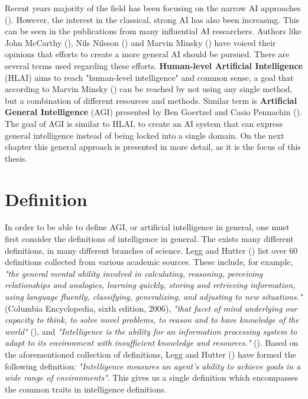 \documentclass[utf8,english]{gradu3}
\begin{document}
Recent years majority of the field has been focusing on the narrow AI approaches
(\cite{goertzel2007}). However, the interest in the classical, strong AI has
also been increasing. This can be seen in the publications from many influential
AI researchers. Authors like John McCarthy (\cite*{mccarthy2007}), Nils Nilsson
(\cite*{nilsson2005}) and Marvin Minsky (\cite*{minsky2007}) have voiced their
opinions that efforts to create a more general AI should be pursued. There are
several terms used regarding these efforts. \textbf{Human-level Artificial
Intelligence} (HLAI) aims to reach "human-level intelligence" and common sense,
a goal that according to Marvin Minsky (\cite*{minsky2004}) can be reached by
not using any single method, but a combination of different resources and
methods. Similar term is \textbf{Artificial General Intelligence} (AGI)
presented by Ben Goertzel and Casio Pennachin (\cite*{goertzel2007}). The goal
of AGI is similar to HLAI, to create an AI system that can express general
intelligence instead of being locked into a single domain. On the next chapter
this general approach is presented in more detail, as it is the focus of this
thesis.


\section{Definition}
\label{definition}

In order to be able to define AGI, or artificial intelligence in general, one
must first consider the definitions of intelligence in general. The exists many
different definitions, in many different branches of science. Legg and Hutter
(\cite*{legg2007}) list over 60 definitions collected from various academic
sources. These include, for example, \emph{"the general mental ability involved
in calculating, reasoning, perceiving relationships and analogies, learning
quickly, storing and retrieving information, using language fluently,
classifying, generalizing, and adjusting to new situations."} (Columbia
Encyclopedia, sixth edition, 2006), \emph{"that facet of mind underlying our
capacity to think, to solve novel problems, to reason and to have knowledge of
the world"} (\cite{anderson2006}), and \emph{"Intelligence is the ability for an
information processing system to adapt to its environment with insufficient
knowledge and resources."} (\cite{wang1995}). Based on the aforementioned
collection of definitions, Legg and Hutter (\cite*{legg2007}) have formed the
following definition: \emph{"Intelligence measures an agent's ability to achieve
goals in a wide range of environments"}. This gives us a single definition which
encompasses the common traits in intelligence definitions.
\end{document}

